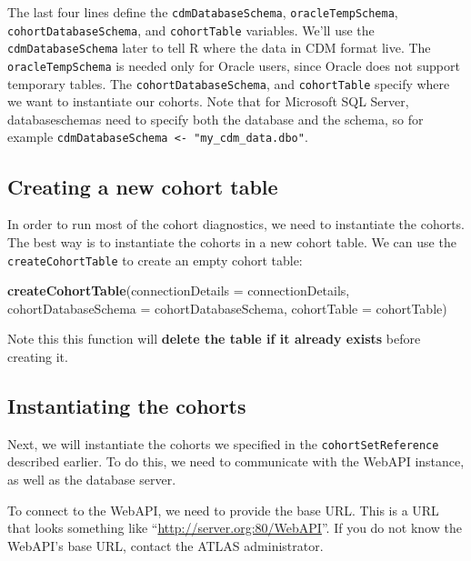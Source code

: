 \documentclass[
]{article}
\newenvironment{Shaded}{\begin{snugshade}}{\end{snugshade}}
\newcommand{\DataTypeTok}[1]{\textcolor[rgb]{0.13,0.29,0.53}{#1}}
\newcommand{\KeywordTok}[1]{\textcolor[rgb]{0.13,0.29,0.53}{\textbf{#1}}}
\newcommand{\NormalTok}[1]{#1}
\begin{document}
The last four lines define the \texttt{cdmDatabaseSchema},
\texttt{oracleTempSchema}, \texttt{cohortDatabaseSchema}, and
\texttt{cohortTable} variables. We'll use the \texttt{cdmDatabaseSchema}
later to tell R where the data in CDM format live. The
\texttt{oracleTempSchema} is needed only for Oracle users, since Oracle
does not support temporary tables. The \texttt{cohortDatabaseSchema},
and \texttt{cohortTable} specify where we want to instantiate our
cohorts. Note that for Microsoft SQL Server, databaseschemas need to
specify both the database and the schema, so for example
\texttt{cdmDatabaseSchema\ \textless{}-\ "my\_cdm\_data.dbo"}.

\hypertarget{creating-a-new-cohort-table}{%
\subsection{Creating a new cohort
table}\label{creating-a-new-cohort-table}}

In order to run most of the cohort diagnostics, we need to instantiate
the cohorts. The best way is to instantiate the cohorts in a new cohort
table. We can use the \texttt{createCohortTable} to create an empty
cohort table:

\begin{Shaded}
\begin{Highlighting}[]
\KeywordTok{createCohortTable}\NormalTok{(}\DataTypeTok{connectionDetails =}\NormalTok{ connectionDetails,}
                  \DataTypeTok{cohortDatabaseSchema =}\NormalTok{ cohortDatabaseSchema,}
                  \DataTypeTok{cohortTable =}\NormalTok{ cohortTable)}
\end{Highlighting}
\end{Shaded}

Note this this function will \textbf{delete the table if it already
exists} before creating it.

\hypertarget{instantiating-the-cohorts}{%
\subsection{Instantiating the cohorts}\label{instantiating-the-cohorts}}

Next, we will instantiate the cohorts we specified in the
\texttt{cohortSetReference} described earlier. To do this, we need to
communicate with the WebAPI instance, as well as the database server.

To connect to the WebAPI, we need to provide the base URL. This is a URL
that looks something like ``\url{http://server.org:80/WebAPI}''. If you
do not know the WebAPI's base URL, contact the ATLAS administrator.
\end{document}

